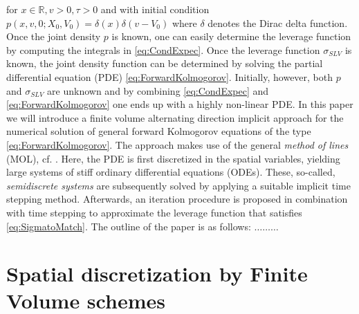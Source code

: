 \documentclass[10pt]{article}
\begin{document}
for $x \in \mathbb{R}, v>0, \tau >0$ and with initial condition $p(x,v,0;X_{0},V_{0}) = \delta(x)\delta(v-V_{0})$ where $\delta$ denotes the Dirac delta function. Once the joint density $p$ is known, one can easily determine the leverage function by computing the integrals in \eqref{eq:CondExpec}. Once the leverage function $\sigma_{SLV}$ is known, the joint density function can be determined by solving the partial differential equation (PDE) \eqref{eq:ForwardKolmogorov}. Initially, however, both $p$ and $\sigma_{SLV}$ are unknown and by combining \eqref{eq:CondExpec} and \eqref{eq:ForwardKolmogorov} one ends up with a highly non-linear PDE. 
In this paper we will introduce a finite volume alternating direction implicit approach for the numerical solution of general forward Kolmogorov equations of the type \eqref{eq:ForwardKolmogorov}. 
The approach makes use of the general \textit{method of lines} (MOL), cf. \cite{HV03}.
Here, the PDE is first discretized in the spatial variables, yielding large systems of stiff ordinary differential equations (ODEs). These, so-called, \textit{semidiscrete systems} are subsequently solved by applying a suitable implicit time stepping method.
Afterwards, an iteration procedure is proposed in combination with time stepping to approximate the leverage function that satisfies \eqref{eq:SigmatoMatch}. The outline of the paper is as follows: $\ldots \ldots \ldots$


\setcounter{equation}{0}
\section{Spatial discretization by Finite Volume schemes}\label{FV}
\end{document}
